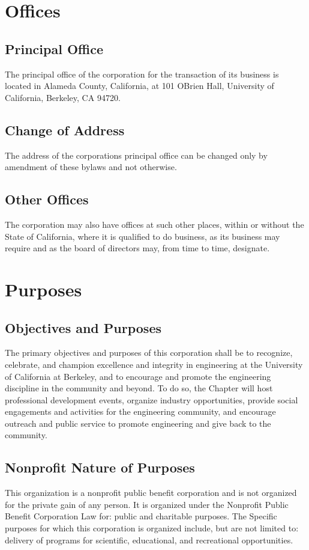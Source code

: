 \documentclass{article}
\begin{document}
	\section{Offices}
	\subsection{Principal Office}
	The principal office of the corporation for the transaction of its business is located in Alameda County, California, at 101 O\textquotesingle Brien Hall, University of California, Berkeley, CA 94720.
	\subsection{Change of Address}
	The address of the corporation\textquotesingle s principal office can be changed only by amendment of these bylaws and not otherwise.
	
	\subsection{Other Offices}
	The corporation may also have offices at such other places, within or without the State of California, where it is qualified to do business, as its business may require and as the board of directors may, from time to time, designate.
	
	\section{Purposes}
	\subsection{Objectives and Purposes}
	The primary objectives and purposes of this corporation shall be to recognize, celebrate, and champion excellence and integrity in engineering at the University of California at Berkeley, and to encourage and promote the engineering discipline in the community and beyond. To do so, the Chapter will host professional development events, organize industry opportunities, provide social engagements and activities for the engineering community, and encourage outreach and public service to promote engineering and give back to the community.
	\subsection{Nonprofit Nature of Purposes}
	This organization is a nonprofit public benefit corporation and is not organized for the private gain of any person. It is organized under the Nonprofit Public Benefit Corporation Law for: public and charitable purposes. The Specific purposes for which this corporation is organized include, but are not limited to: delivery of programs for scientific, educational, and recreational opportunities.
	
\end{document}
